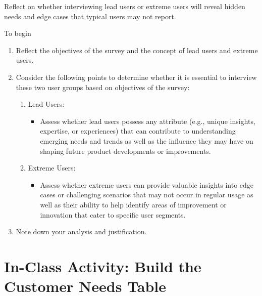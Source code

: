 \begin{tcolorbox}[title=Hint]
Reflect on whether interviewing lead users or extreme users will reveal hidden needs and edge cases that typical users may not report.
\end{tcolorbox}

\smallskip
\noindent
To begin
\begin{enumerate}
    \item Reflect the objectives of the survey and the concept of lead users and extreme users.
    \item Consider the following points to determine whether it is essential to interview these two user groups based on objectives of the survey:
    \begin{enumerate}
        \item Lead Users:
        \begin{itemize}
            \item Assess whether lead users possess any attribute (e.g., unique insights, expertise, or experiences) that can contribute to understanding emerging needs and trends as well as the influence they may have on shaping future product developments or improvements.
        \end{itemize}
        \item Extreme Users:
        \begin{itemize}
            \item Assess whether extreme users can provide valuable insights into edge cases or challenging scenarios that may not occur in regular usage as well as their ability to help identify areas of improvement or innovation that cater to specific user segments.
        \end{itemize}
    \end{enumerate}
    \item Note down your analysis and justification.
\end{enumerate}



\section{In-Class Activity: Build the Customer Needs Table}

